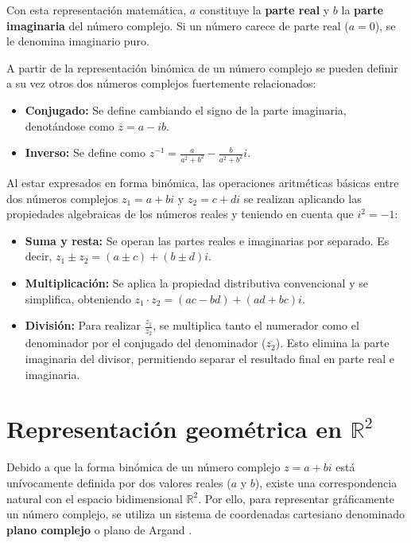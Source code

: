Con esta representación matemática, $a$ constituye la \textbf{parte real} y $b$ la \textbf{parte imaginaria} del número complejo. Si un número carece de parte real ($a=0$), se le denomina imaginario puro.

A partir de la representación binómica de un número complejo se pueden definir a su vez otros dos números complejos fuertemente relacionados:

\begin{itemize}
    \item \textbf{Conjugado:} Se define cambiando el signo de la parte imaginaria, denotándose como $\overline{z} = a - ib$.
    \item \textbf{Inverso:} Se define como $z^{-1} = \frac{a}{a^2 + b^2} - \frac{b}{a^2 + b^2}i$.
\end{itemize}

Al estar expresados en forma binómica, las operaciones aritméticas básicas entre dos números complejos $z_1 = a + bi$ y $z_2 = c + di$ se realizan aplicando las propiedades algebraicas de los números reales y teniendo en cuenta que $i^2 = -1$:

\begin{itemize}
    \item \textbf{Suma y resta:} Se operan las partes reales e imaginarias por separado. Es decir, $z_1 \pm z_2 = (a \pm c) + (b \pm d)i$.
    \item \textbf{Multiplicación:} Se aplica la propiedad distributiva convencional y se simplifica, obteniendo $z_1 \cdot z_2 = (ac - bd) + (ad + bc)i$.
    \item \textbf{División:} Para realizar $\frac{z_1}{z_2}$, se multiplica tanto el numerador como el denominador por el conjugado del denominador ($\overline{z_2}$). Esto elimina la parte imaginaria del divisor, permitiendo separar el resultado final en parte real e imaginaria.
\end{itemize}

\section{Representación geométrica en $\mathbb{R}^2$}

Debido a que la forma binómica de un número complejo $z = a + bi$ está unívocamente definida por dos valores reales ($a$ y $b$), existe una correspondencia natural con el espacio bidimensional $\mathbb{R}^2$. Por ello, para representar gráficamente un número complejo, se utiliza un sistema de coordenadas cartesiano denominado \textbf{plano complejo} o plano de Argand \cite{sangaku_representacion_complejos}.

